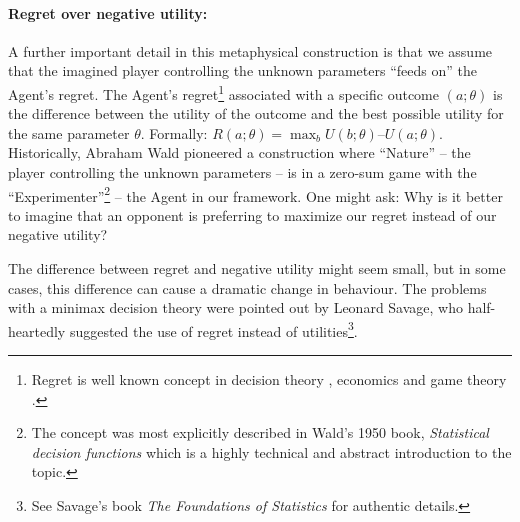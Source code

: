 \documentclass{article}
\begin{document}
\paragraph{Regret over negative utility:}
A further important detail in this metaphysical construction is that we assume that the imagined player controlling the unknown parameters ``feeds on'' the Agent’s regret.
The Agent’s regret\footnote{Regret is well known concept in decision theory \cite{paper:Milnor}, economics \cite{book:EconomicsDictionary} and game theory \cite{book:EssentialGameTheory}.} associated with a specific outcome $(a;\theta)$ is the difference between the utility of the outcome and the best possible utility for the same parameter $\theta$. Formally: $R(a;\theta) = \max_{b} U(b;\theta) – U(a;\theta)$.
Historically, Abraham Wald pioneered a construction where ``Nature'' – the player controlling the unknown parameters – is in a zero-sum game with the ``Experimenter''\footnote{The concept was most explicitly described in Wald's 1950 book, \emph{Statistical decision functions} \cite{book:Wald} which is a highly technical and abstract introduction to the topic.} – the Agent in our framework.
One might ask: Why is it better to imagine that an opponent is preferring to maximize our regret instead of our negative utility?

The difference between regret and negative utility might seem small, but in some cases, this difference can cause a dramatic change in behaviour.
The problems with a minimax decision theory were pointed out by Leonard Savage, who half-heartedly suggested the use of regret instead of utilities\footnote{See Savage's book \emph{The Foundations of Statistics} \cite{book:Savage} for authentic details.}.
\end{document}
